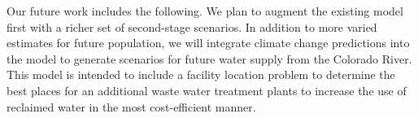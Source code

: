 \documentclass[ijoc,letterpaper]{informs3} %
\begin{document}
Our future work includes the following. We plan to augment the existing model first with a richer set of second-stage scenarios.
In addition to more varied estimates for future population, we will integrate climate change predictions into the model to generate scenarios for future water supply from the Colorado River. 
This model is intended to include a facility location problem to determine the best places for an additional waste water treatment plants to increase the use of reclaimed water in the most cost-efficient manner.



%
%
%





\end{document}
